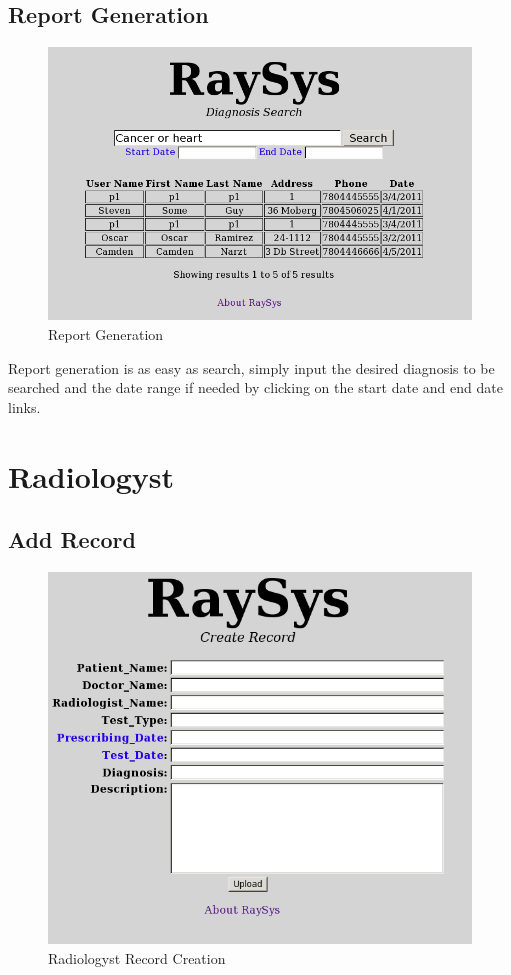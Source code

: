 \documentclass[11pt]{report}
\begin{document}
\section*{Report Generation}
\begin{figure}[htb]
  \begin{center}
    \includegraphics[scale=0.60]{imgs/rg1.png}
    \caption{Report Generation}
    \label{fig:rg1}
  \end{center}
\end{figure}

Report generation is as easy as search, simply input the desired diagnosis to be searched and the date range if needed by clicking on the start date and end date links.

\chapter*{Radiologyst}
\section*{Add Record}
\begin{figure}[htb]
  \begin{center}
    \includegraphics[scale=0.60]{imgs/rad1.png}
    \caption{Radiologyst Record Creation}
    \label{fig:rad1}
  \end{center}
\end{figure}
\end{document}
